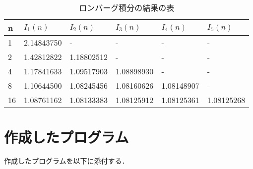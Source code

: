 \documentclass[a4j,11pt]{jarticle}
\begin{document}
\begin{table}[tbp]
    \begin{center}
    \begin{tabular}{|l|l|l|l|l|l|}
    \hline
    n  & $I_1(n)$    & $I_2(n)$    & $I_3(n)$    & $I_4(n)$    & $I_5(n)$    \\ \hline
    1  & 2.14843750 & -          & -          & -          & -          \\ \hline
    2  & 1.42812822 & 1.18802512 & -          & -          & -          \\ \hline
    4  & 1.17841633 & 1.09517903 & 1.08898930 & -          & -          \\ \hline
    8  & 1.10644500 & 1.08245456 & 1.08160626 & 1.08148907 & -          \\ \hline
    16 & 1.08761162 & 1.08133383 & 1.08125912 & 1.08125361 & 1.08125268 \\ \hline
    \end{tabular}
    \end{center}
    \caption{ロンバーグ積分の結果の表}
    \label{table2}
\end{table}
\section{作成したプログラム}
\label{sec:program}
\normalsize
作成したプログラムを以下に添付する．
\end{document}
